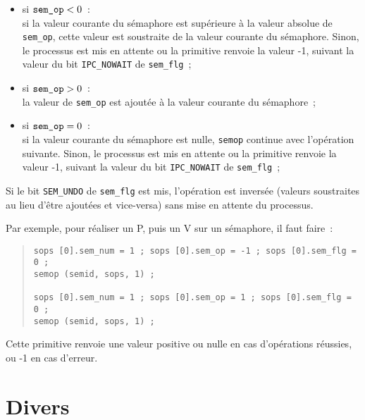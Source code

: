 \documentclass [twoside] {report}
\begin{document}
\begin {itemize}
    \item si $\mbox {\tt sem\_op} < 0$~:\\
	si la valeur courante du sémaphore est supérieure à la valeur
	absolue de {\tt sem\_op}, cette valeur est soustraite de la
	valeur courante du sémaphore. Sinon, le processus est mis en
	attente ou la primitive renvoie la valeur -1, suivant la valeur
	du bit {\tt IPC\_NOWAIT} de {\tt sem\_flg}~;

    \item si $\mbox {\tt sem\_op} > 0$~:\\
	la valeur de {\tt sem\_op} est ajoutée à la valeur courante du
	sémaphore~;

    \item si $\mbox {\tt sem\_op} = 0$~:\\
	si la valeur courante du sémaphore est nulle, {\tt semop}
	continue avec l'opération suivante. Sinon, le processus est mis
	en attente ou la primitive renvoie la valeur -1, suivant la
	valeur du bit {\tt IPC\_NOWAIT} de {\tt sem\_flg}~;
\end {itemize}

Si le bit {\tt SEM\_UNDO} de {\tt sem\_flg} est mis, l'opération est
inversée (valeurs soustraites au lieu d'être ajoutées et vice-versa)
sans mise en attente du processus.

Par exemple, pour réaliser un P, puis un V sur un sémaphore, il faut
faire~:

\begin {quote}
\small
\begin {verbatim}
sops [0].sem_num = 1 ; sops [0].sem_op = -1 ; sops [0].sem_flg = 0 ;
semop (semid, sops, 1) ;

sops [0].sem_num = 1 ; sops [0].sem_op = 1 ; sops [0].sem_flg = 0 ;
semop (semid, sops, 1) ;
\end{verbatim}
\end {quote}

Cette primitive renvoie une valeur positive ou nulle en cas
d'opérations réussies, ou -1 en cas d'erreur.



\section {Divers}
\end{document}
